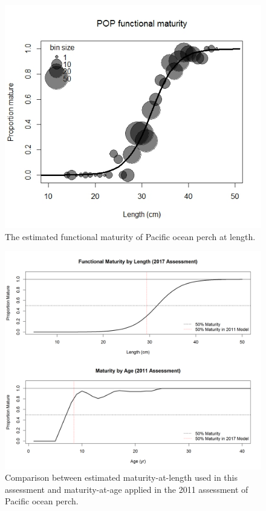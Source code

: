 \documentclass[12pt,]{article}
\begin{document}
\begin{figure}
\centering
\includegraphics{Figures/Functional_Maturity.png}
\caption{The estimated functional maturity of Pacific ocean perch at
length. \label{fig:mat}}
\end{figure}

\begin{figure}
\centering
\includegraphics{Figures/Maturity_Comparison.png}
\caption{Comparison between estimated maturity-at-length used in this
assessment and maturity-at-age applied in the 2011 assessment of Pacific
ocean perch. \label{fig:mat_compare}}
\end{figure}
\end{document}
